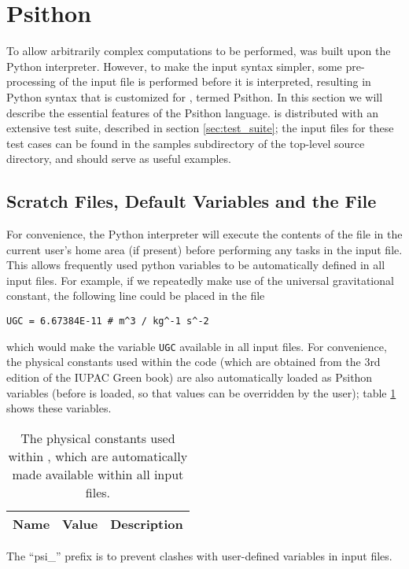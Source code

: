\section{Psithon} \label{sec:psithon}
\renewcommand{\optionname}[2]{\texttt{\nameref{op-#2-#1}}}
 
To allow arbitrarily complex computations to be performed, \PSIfour was built
upon the Python interpreter. However, to make the input syntax simpler, some
pre-processing of the input file is performed before it is interpreted,
resulting in Python syntax that is customized for \PSI, termed Psithon.  In
this section we will describe the essential features of the Psithon language.
\PSIfour is distributed with an extensive test suite, described in section
\ref{sec:test_suite}; the input files for these test cases can be found in the
samples subdirectory of the top-level \PSIfour source directory, and should
serve as useful examples.

\subsection{Scratch Files, Default Variables and the \psirc File} \label{sec:psirc}
For convenience, the Python interpreter will execute the contents of the
\psirc file in the current user's home area (if present) before performing any
tasks in the input file.  This allows frequently used python variables to be
automatically defined in all input files.  For example, if we repeatedly make
use of the universal gravitational constant, the following line could be placed
in the \psirc file
\begin{verbatim}
UGC = 6.67384E-11 # m^3 / kg^-1 s^-2
\end{verbatim}
which would make the variable {\tt UGC} available in all \PSIfour input files.
For convenience, the physical constants used within the \PSIfour code (which
are obtained from the 3rd edition of the IUPAC Green
book\cite{Cohen:GreenBook:2008}) are also automatically loaded as Psithon
variables (before \psirc is loaded, so that \psirc values can be overridden by
the user); table \ref{tab:physconst} shows these variables.
\begin{table}[h!]
    \caption{The physical constants used within \PSIfour, which are automatically
             made available within all \PSIfour input files.}
    \label{tab:physconst}
    \setlength{\tabcolsep}{1pt}
    \small
    \begin{tabular}{lll}
        \hline
        \hline
        Name & Value & Description \\
        \hline
        
        \hline
        \hline
    \end{tabular}
\end{table}
The ``psi\_'' prefix is to prevent clashes with user-defined variables in
\PSIfour input files.

